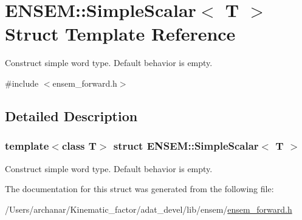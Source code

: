 \hypertarget{structENSEM_1_1SimpleScalar}{}\section{E\+N\+S\+EM\+:\+:Simple\+Scalar$<$ T $>$ Struct Template Reference}
\label{structENSEM_1_1SimpleScalar}


Construct simple word type. Default behavior is empty.  




{\ttfamily \#include $<$ensem\+\_\+forward.\+h$>$}



\subsection{Detailed Description}
\subsubsection*{template$<$class T$>$\newline
struct E\+N\+S\+E\+M\+::\+Simple\+Scalar$<$ T $>$}

Construct simple word type. Default behavior is empty. 

The documentation for this struct was generated from the following file\+:\begin{DoxyCompactItemize}
\item 
/\+Users/archanar/\+Kinematic\+\_\+factor/adat\+\_\+devel/lib/ensem/\mbox{\hyperlink{lib_2ensem_2ensem__forward_8h}{ensem\+\_\+forward.\+h}}\end{DoxyCompactItemize}

